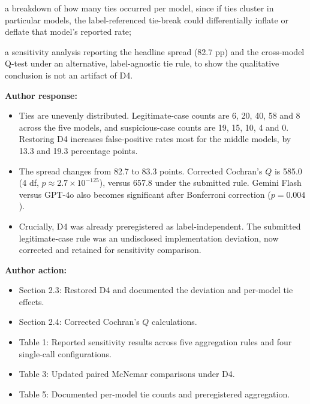 \documentclass[11pt]{article}
\newcommand{\rvcomment}[1]{{\color{ReviewerGreen}#1}}
\begin{document}
\rvcomment{a breakdown of how many ties occurred per model, since if ties cluster in particular models, the label-referenced tie-break could differentially inflate or deflate that model's reported rate;}

\rvcomment{a sensitivity analysis reporting the headline spread (82.7 pp) and the cross-model Q-test under an alternative, label-agnostic tie rule, to show the qualitative conclusion is not an artifact of D4.}

\textbf{Author response:}

\begin{itemize}

\item Ties are unevenly distributed. Legitimate-case counts are 6, 20, 40, 58 and 8 across the five models, and suspicious-case counts are 19, 15, 10, 4 and 0. Restoring D4 increases false-positive rates most for the middle models, by 13.3 and 19.3 percentage points.

\item The spread changes from 82.7 to 83.3 points. Corrected Cochran's $Q$ is 585.0 (4 df, $p \approx 2.7\times10^{-125}$), versus 657.8 under the submitted rule. Gemini Flash versus GPT-4o also becomes significant after Bonferroni correction ($p = 0.004$).

\item Crucially, D4 was already preregistered as label-independent. The submitted legitimate-case rule was an undisclosed implementation deviation, now corrected and retained for sensitivity comparison.

\end{itemize}

\textbf{Author action:}

\begin{itemize}

\item Section 2.3: Restored D4 and documented the deviation and per-model tie effects.

\item Section 2.4: Corrected Cochran's $Q$ calculations.

\item Table 1: Reported sensitivity results across five aggregation rules and four single-call configurations.

\item Table 3: Updated paired McNemar comparisons under D4.

\item Table 5: Documented per-model tie counts and preregistered aggregation.

\end{itemize}
\end{document}
